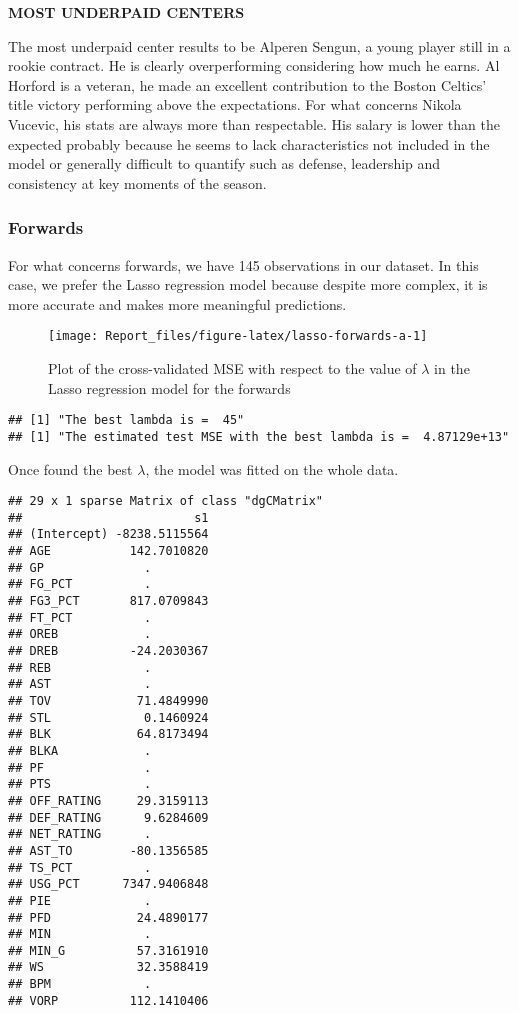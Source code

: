 \documentclass[
]{article}
\begin{document}
\textbf{MOST UNDERPAID CENTERS}

The most underpaid center results to be Alperen Sengun, a young player
still in a rookie contract. He is clearly overperforming considering how
much he earns. Al Horford is a veteran, he made an excellent
contribution to the Boston Celtics' title victory performing above the
expectations. For what concerns Nikola Vucevic, his stats are always
more than respectable. His salary is lower than the expected probably
because he seems to lack characteristics not included in the model or
generally difficult to quantify such as defense, leadership and
consistency at key moments of the season.

\hypertarget{forwards}{%
\subsubsection{Forwards}\label{forwards}}

For what concerns forwards, we have 145 observations in our dataset. In
this case, we prefer the Lasso regression model because despite more
complex, it is more accurate and makes more meaningful predictions.

\begin{figure}

{\centering \texttt{[image: Report\_files/figure-latex/lasso-forwards-a-1]} 

}

\caption{Plot of the cross-validated MSE with respect to the value of $\lambda$ in the Lasso regression model for the forwards}\label{fig:lasso-forwards-a}
\end{figure}

\begin{verbatim}
## [1] "The best lambda is =  45"
## [1] "The estimated test MSE with the best lambda is =  4.87129e+13"
\end{verbatim}

Once found the best \(\lambda\), the model was fitted on the whole data.

\begin{verbatim}
## 29 x 1 sparse Matrix of class "dgCMatrix"
##                        s1
## (Intercept) -8238.5115564
## AGE           142.7010820
## GP              .        
## FG_PCT          .        
## FG3_PCT       817.0709843
## FT_PCT          .        
## OREB            .        
## DREB          -24.2030367
## REB             .        
## AST             .        
## TOV            71.4849990
## STL             0.1460924
## BLK            64.8173494
## BLKA            .        
## PF              .        
## PTS             .        
## OFF_RATING     29.3159113
## DEF_RATING      9.6284609
## NET_RATING      .        
## AST_TO        -80.1356585
## TS_PCT          .        
## USG_PCT      7347.9406848
## PIE             .        
## PFD            24.4890177
## MIN             .        
## MIN_G          57.3161910
## WS             32.3588419
## BPM             .        
## VORP          112.1410406
\end{verbatim}
\end{document}
